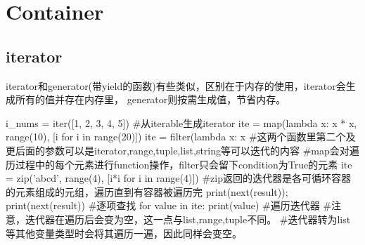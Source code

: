 \section{Container}

  \subsection{iterator}
    iterator和generator(带yield的函数)有些类似，区别在于内存的使用，iterator会生成所有的值并存在内存里，
    generator则按需生成值，节省内存。
    \begin{codeblock}[language=python, caption={iterator}]
      i_nums = iter([1, 2, 3, 4, 5]) #从iterable生成iterator
      ite = map(lambda x: x * x, range(10), [i for i in range(20)])
      ite = filter(lambda x: x %
      #这两个函数里第二个及更后面的参数可以是iterator,range,tuple,list,string等可以迭代的内容
      #map会对遍历过程中的每个元素进行function操作，filter只会留下condition为True的元素
      ite = zip('abcd', range(4), [i*i for i in range(4)])
      #zip返回的迭代器是各可循环容器的元素组成的元组，遍历直到有容器被遍历完
      print(next(result)); print(next(result)) #逐项查找
      for value in ite:
        print(value) #遍历迭代器
      #注意，迭代器在遍历后会变为空，这一点与list,range,tuple不同。
      #迭代器转为list等其他变量类型时会将其遍历一遍，因此同样会变空。
    \end{codeblock}

